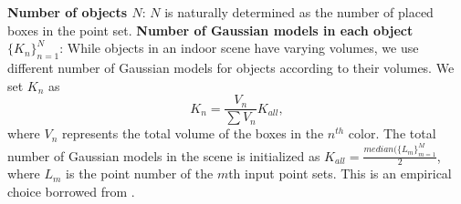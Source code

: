 \noindent\textbf{Number of objects $N$}: $N$ is naturally determined as the number of placed boxes in the point set.
%
\noindent\textbf{Number of Gaussian models in each object $\{K_n\}^N_{n=1}$}: While objects in an indoor scene have varying volumes, we use different number of Gaussian models for objects according to their volumes. We set $K_n$ as 
\begin{equation}
\label{equ:K_n}
K_n=\frac{V_n}{\sum V_n}K_{all},
\end{equation}
%
where $V_n$ represents the total volume of the boxes in the $n^{th}$ color. 
The total number of Gaussian models in the scene is initialized as $K_{all}=\frac{median(\{L_m\}^M_{m=1}}{2}$, where $L_m$ is the point number of the $m$th input point sets. 
This is an empirical choice borrowed from \cite{Evangelidis2014}.

